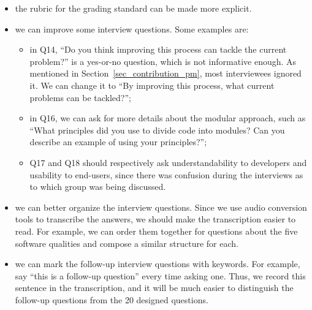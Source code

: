 \documentclass[final, 3p, times, authoryear]{elsarticle}
\begin{document}
\begin{itemize}
	\item the rubric for the grading standard can be made more explicit.
	\item we can improve some interview questions. Some examples are:
	\begin{itemize}
	    \item in {Q14}, ``Do you think improving this process can
	    tackle the current problem?'' is a yes-or-no question, which is not
	    informative enough. As mentioned in Section~\ref{sec_contribution_pm},
	    most interviewees ignored it. We can change it to ``By improving this
	    process, what current problems can be tackled?''; 
	    \item in {Q16}, we can ask for more details about the modular
	    approach, such as ``What principles did you use to divide code into
	    modules? Can you describe an example of using your principles?'';
	    \item {Q17} and {Q18} should respectively ask understandability to
	    developers and usability to end-users, since there was confusion during
	    the interviews as to which group was being discussed.
	\end{itemize}
	\item we can better organize the interview questions. Since we use audio
	conversion tools to transcribe the answers, we should make the transcription
	easier to read. For example, we can order them together for questions about
	the five software qualities and compose a similar structure for each.
	\item we can mark the follow-up interview questions with keywords. For
	example, say ``this is a follow-up question'' every time asking one. Thus, we
	record this sentence in the transcription, and it will be much easier to
	distinguish the follow-up questions from the 20 designed questions.
\end{itemize}











\end{document}
